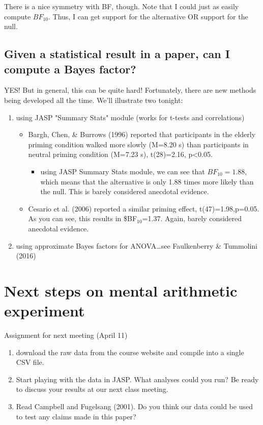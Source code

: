 \documentclass[11pt]{article}
\begin{document}
There is a nice symmetry with BF, though.  Note that I could just as easily compute $BF_{10}$.  Thus, I can get support for the alternative OR support for the null.

\subsection*{Given a statistical result in a paper, can I compute a Bayes factor?}
\label{sec-2-3}

YES!  But in general, this can be quite hard!  Fortunately, there are new methods being developed all the time.  We'll illustrate two tonight:

\begin{enumerate}
\item using JASP "Summary Stats" module (works for t-tests and correlations)
\begin{itemize}
\item Bargh, Chen, \& Burrows (1996) reported that participants in the elderly priming condition walked more slowly (M=8.20 s) than participants in neutral priming condition (M=7.23 s), t(28)=2.16, p<0.05.
\begin{itemize}
\item using JASP Summary Stats module, we can see that $BF_{10}=1.88$, which means that the alternative is only 1.88 times more likely than the null.  This is barely considered anecdotal evidence.
\end{itemize}
\item Cesario et al. (2006) reported a similar priming effect, t(47)=1.98,p=0.05.  As you can see, this results in \$BF$_{\text{10}}$=1.37.  Again, barely considered anecdotal evidence.
\end{itemize}

\item using approximate Bayes factors for ANOVA\ldots{}see Faulkenberry \& Tummolini (2016)
\end{enumerate}





\section*{Next steps on mental arithmetic experiment}
\label{sec-3}
Assignment for next meeting (April 11)

\begin{enumerate}
\item download the raw data from the course website and compile into a single CSV file.
\item Start playing with the data in JASP.  What analyses could you run?  Be ready to discuss your results at our next class meeting.
\item Read Campbell and Fugelsang (2001).  Do you think our data could be used to test any claims made in this paper?
\end{enumerate}
\end{document}
